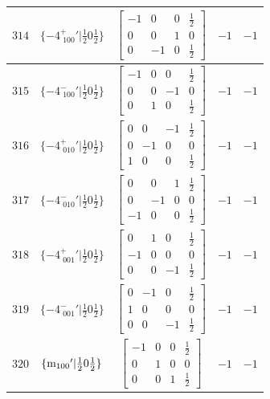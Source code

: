 \documentclass[fleqn,8pt]{jsarticle}
\begin{document}
\begin{longtable}{ccccc}
$ 314 $ & $ \{-4^{+}_{\,\,100}{}'|\frac{1}{2} 0 \frac{1}{2}\} $ & $ \begin{bmatrix} -1 & 0 & 0 & \frac{1}{2} \\ 0 & 0 & 1 & 0 \\ 0 & -1 & 0 & \frac{1}{2} \end{bmatrix} $ & $ -1 $ & $ -1 $ \\ \hline
$ 315 $ & $ \{-4^{-}_{\,\,100}{}'|\frac{1}{2} 0 \frac{1}{2}\} $ & $ \begin{bmatrix} -1 & 0 & 0 & \frac{1}{2} \\ 0 & 0 & -1 & 0 \\ 0 & 1 & 0 & \frac{1}{2} \end{bmatrix} $ & $ -1 $ & $ -1 $ \\ \hline
$ 316 $ & $ \{-4^{+}_{\,\,010}{}'|\frac{1}{2} 0 \frac{1}{2}\} $ & $ \begin{bmatrix} 0 & 0 & -1 & \frac{1}{2} \\ 0 & -1 & 0 & 0 \\ 1 & 0 & 0 & \frac{1}{2} \end{bmatrix} $ & $ -1 $ & $ -1 $ \\ \hline
$ 317 $ & $ \{-4^{-}_{\,\,010}{}'|\frac{1}{2} 0 \frac{1}{2}\} $ & $ \begin{bmatrix} 0 & 0 & 1 & \frac{1}{2} \\ 0 & -1 & 0 & 0 \\ -1 & 0 & 0 & \frac{1}{2} \end{bmatrix} $ & $ -1 $ & $ -1 $ \\ \hline
$ 318 $ & $ \{-4^{+}_{\,\,001}{}'|\frac{1}{2} 0 \frac{1}{2}\} $ & $ \begin{bmatrix} 0 & 1 & 0 & \frac{1}{2} \\ -1 & 0 & 0 & 0 \\ 0 & 0 & -1 & \frac{1}{2} \end{bmatrix} $ & $ -1 $ & $ -1 $ \\ \hline
$ 319 $ & $ \{-4^{-}_{\,\,001}{}'|\frac{1}{2} 0 \frac{1}{2}\} $ & $ \begin{bmatrix} 0 & -1 & 0 & \frac{1}{2} \\ 1 & 0 & 0 & 0 \\ 0 & 0 & -1 & \frac{1}{2} \end{bmatrix} $ & $ -1 $ & $ -1 $ \\ \hline
$ 320 $ & $ \{{\rm m}_{100}{}'|\frac{1}{2} 0 \frac{1}{2}\} $ & $ \begin{bmatrix} -1 & 0 & 0 & \frac{1}{2} \\ 0 & 1 & 0 & 0 \\ 0 & 0 & 1 & \frac{1}{2} \end{bmatrix} $ & $ -1 $ & $ -1 $ \\ \hline

\end{longtable}
\end{document}
